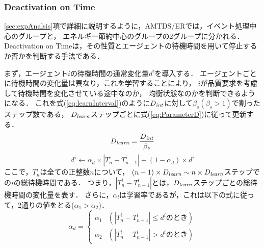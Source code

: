 \documentclass[12pt,a4j,twoside]{jarticle}
\def\DeactCheckInterval{D_{\it int}}
\def\DeactLearnInterval{D_{\it learn}}
\begin{document}
  \subsubsection{Deactivation on Time}\label{sec:TimeStop}
  \ref{sec:expAnalsis}項で詳細に説明するように，AMTDS/ERでは，イベント処理中心のグループと，
  エネルギー節約中心のグループの2グループに分かれる．
  Deactivation on Timeは，その性質とエージェントの待機時間を用いて停止するか否かを判断する手法である．
  \par
  
  まず，エージェント$i$の待機時間の通常変化量$d^i$を導入する．
  エージェントごとに待機時間の変化量は異なり，これを学習することにより，
  $i$が品質要求を考慮して待機時間を変化させている途中なのか，
  均衡状態なのかを判断できるようになる．
  これを式(\ref{eq:learnInterval})のように$\DeactCheckInterval$に対して$\beta_s(\beta_s > 1)$で割ったステップ数である，
  $\DeactLearnInterval$ステップごとに式(\ref{eq:ParameterD})に従って更新する．
  \begin{equation}\label{eq:learnInterval}
    \DeactLearnInterval = \dfrac{\DeactCheckInterval}{\beta_s}
  \end{equation}
  \begin{equation}\label{eq:ParameterD}
    d^i \gets \alpha_d \times |T^i_n - T^i_{n-1}| + (1-\alpha_d) \times d^i
  \end{equation}
  ここで，$T^i_n$は全ての正整数$n$について，
  $(n-1) \times \DeactLearnInterval \sim n \times \DeactLearnInterval$ステップでの$i$の総待機時間である．
  つまり，$|T^i_n - T^i_{n-1}|$とは，$\DeactLearnInterval$ステップごとの総待機時間の変化量を表す．
  さらに，$\alpha_l$は学習率であるが，これは以下の式に従って，2通りの値をとる($\alpha_1 > \alpha_2$)．
    \begin{equation}
      \alpha_d = 
      \begin{cases}
        \alpha_1 & (|T^i_n - T^i_{n-1}| \leq d^i \textrm{のとき}) \\
        \alpha_2 & (|T^i_n - T^i_{n-1}| > d^i \textrm{のとき})
      \end{cases}
    \end{equation}
  \par
\end{document}
